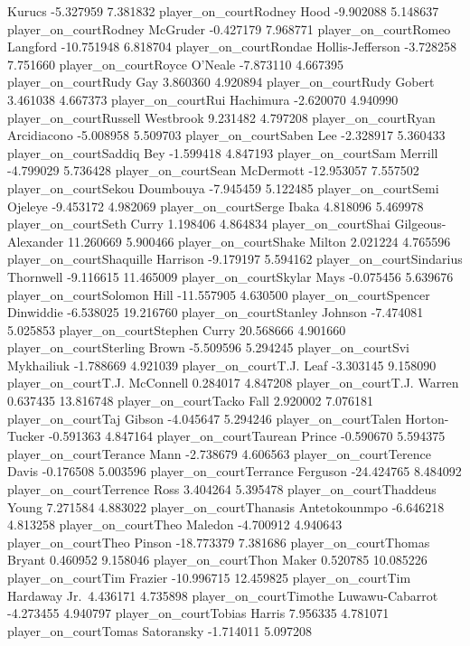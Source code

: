 \documentclass[
  landscape]{article}
\begin{document}
Kurucs -5.327959 7.381832 player\_on\_courtRodney Hood -9.902088
5.148637 player\_on\_courtRodney McGruder -0.427179 7.968771
player\_on\_courtRomeo Langford -10.751948 6.818704
player\_on\_courtRondae Hollis-Jefferson -3.728258 7.751660
player\_on\_courtRoyce O'Neale -7.873110 4.667395 player\_on\_courtRudy
Gay 3.860360 4.920894 player\_on\_courtRudy Gobert 3.461038 4.667373
player\_on\_courtRui Hachimura -2.620070 4.940990
player\_on\_courtRussell Westbrook 9.231482 4.797208
player\_on\_courtRyan Arcidiacono -5.008958 5.509703
player\_on\_courtSaben Lee -2.328917 5.360433 player\_on\_courtSaddiq
Bey -1.599418 4.847193 player\_on\_courtSam Merrill -4.799029 5.736428
player\_on\_courtSean McDermott -12.953057 7.557502
player\_on\_courtSekou Doumbouya -7.945459 5.122485
player\_on\_courtSemi Ojeleye -9.453172 4.982069 player\_on\_courtSerge
Ibaka 4.818096 5.469978 player\_on\_courtSeth Curry 1.198406 4.864834
player\_on\_courtShai Gilgeous-Alexander 11.260669 5.900466
player\_on\_courtShake Milton 2.021224 4.765596
player\_on\_courtShaquille Harrison -9.179197 5.594162
player\_on\_courtSindarius Thornwell -9.116615 11.465009
player\_on\_courtSkylar Mays -0.075456 5.639676 player\_on\_courtSolomon
Hill -11.557905 4.630500 player\_on\_courtSpencer Dinwiddie -6.538025
19.216760 player\_on\_courtStanley Johnson -7.474081 5.025853
player\_on\_courtStephen Curry 20.568666 4.901660
player\_on\_courtSterling Brown -5.509596 5.294245 player\_on\_courtSvi
Mykhailiuk -1.788669 4.921039 player\_on\_courtT.J. Leaf -3.303145
9.158090 player\_on\_courtT.J. McConnell 0.284017 4.847208
player\_on\_courtT.J. Warren 0.637435 13.816748 player\_on\_courtTacko
Fall 2.920002 7.076181 player\_on\_courtTaj Gibson -4.045647 5.294246
player\_on\_courtTalen Horton-Tucker -0.591363 4.847164
player\_on\_courtTaurean Prince -0.590670 5.594375
player\_on\_courtTerance Mann -2.738679 4.606563
player\_on\_courtTerence Davis -0.176508 5.003596
player\_on\_courtTerrance Ferguson -24.424765 8.484092
player\_on\_courtTerrence Ross 3.404264 5.395478
player\_on\_courtThaddeus Young 7.271584 4.883022
player\_on\_courtThanasis Antetokounmpo -6.646218 4.813258
player\_on\_courtTheo Maledon -4.700912 4.940643 player\_on\_courtTheo
Pinson -18.773379 7.381686 player\_on\_courtThomas Bryant 0.460952
9.158046 player\_on\_courtThon Maker 0.520785 10.085226
player\_on\_courtTim Frazier -10.996715 12.459825 player\_on\_courtTim
Hardaway Jr.~4.436171 4.735898 player\_on\_courtTimothe Luwawu-Cabarrot
-4.273455 4.940797 player\_on\_courtTobias Harris 7.956335 4.781071
player\_on\_courtTomas Satoransky -1.714011 5.097208
\end{document}
